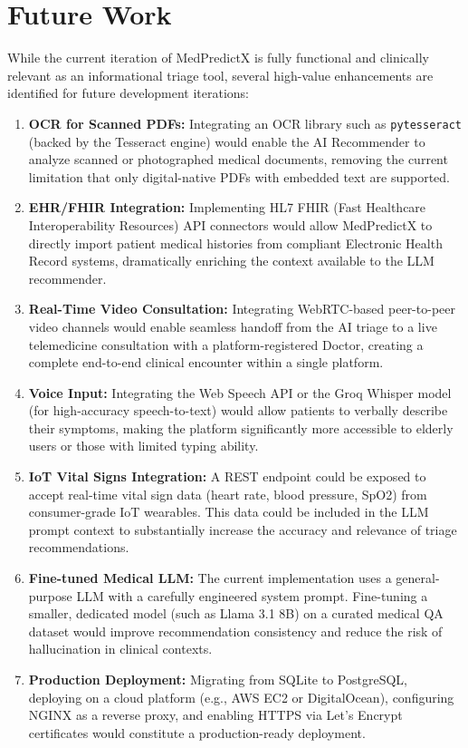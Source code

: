 \section{Future Work}

While the current iteration of MedPredictX is fully functional and clinically relevant as an informational triage tool, several high-value enhancements are identified for future development iterations:

\begin{enumerate}
    \item \textbf{OCR for Scanned PDFs:} Integrating an OCR library such as \texttt{pytesseract} (backed by the Tesseract engine) would enable the AI Recommender to analyze scanned or photographed medical documents, removing the current limitation that only digital-native PDFs with embedded text are supported.

    \item \textbf{EHR/FHIR Integration:} Implementing HL7 FHIR (Fast Healthcare Interoperability Resources) API connectors would allow MedPredictX to directly import patient medical histories from compliant Electronic Health Record systems, dramatically enriching the context available to the LLM recommender.

    \item \textbf{Real-Time Video Consultation:} Integrating WebRTC-based peer-to-peer video channels would enable seamless handoff from the AI triage to a live telemedicine consultation with a platform-registered Doctor, creating a complete end-to-end clinical encounter within a single platform.

    \item \textbf{Voice Input:} Integrating the Web Speech API or the Groq Whisper model (for high-accuracy speech-to-text) would allow patients to verbally describe their symptoms, making the platform significantly more accessible to elderly users or those with limited typing ability.

    \item \textbf{IoT Vital Signs Integration:} A REST endpoint could be exposed to accept real-time vital sign data (heart rate, blood pressure, SpO2) from consumer-grade IoT wearables. This data could be included in the LLM prompt context to substantially increase the accuracy and relevance of triage recommendations.

    \item \textbf{Fine-tuned Medical LLM:} The current implementation uses a general-purpose LLM with a carefully engineered system prompt. Fine-tuning a smaller, dedicated model (such as Llama 3.1 8B) on a curated medical QA dataset would improve recommendation consistency and reduce the risk of hallucination in clinical contexts.

    \item \textbf{Production Deployment:} Migrating from SQLite to PostgreSQL, deploying on a cloud platform (e.g., AWS EC2 or DigitalOcean), configuring NGINX as a reverse proxy, and enabling HTTPS via Let's Encrypt certificates would constitute a production-ready deployment.
\end{enumerate}
